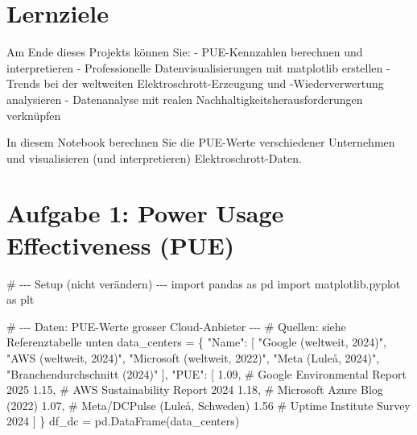 \documentclass[
  nswissgerman,
  a4paper,
  DIV=11,
  numbers=noendperiod,
  ngerman]{scrreprt}
\newenvironment{Shaded}{\begin{snugshade}}{\end{snugshade}}
\newcommand{\CommentTok}[1]{\textcolor[rgb]{0.37,0.37,0.37}{#1}}
\newcommand{\FloatTok}[1]{\textcolor[rgb]{0.68,0.00,0.00}{#1}}
\newcommand{\ImportTok}[1]{\textcolor[rgb]{0.00,0.46,0.62}{#1}}
\newcommand{\NormalTok}[1]{\textcolor[rgb]{0.00,0.23,0.31}{#1}}
\newcommand{\OperatorTok}[1]{\textcolor[rgb]{0.37,0.37,0.37}{#1}}
\newcommand{\StringTok}[1]{\textcolor[rgb]{0.13,0.47,0.30}{#1}}
\begin{document}
\section{Lernziele}\label{lernziele-1}

Am Ende dieses Projekts können Sie: - PUE-Kennzahlen berechnen und
interpretieren - Professionelle Datenvisualisierungen mit matplotlib
erstellen - Trends bei der weltweiten Elektroschrott-Erzeugung und
-Wiederverwertung analysieren - Datenanalyse mit realen
Nachhaltigkeitsherausforderungen verknüpfen

In diesem Notebook berechnen Sie die PUE-Werte verschiedener Unternehmen
und visualisieren (und interpretieren) Elektroschrott-Daten.

\section{Aufgabe 1: Power Usage Effectiveness
(PUE)}\label{aufgabe-1-power-usage-effectiveness-pue}

\begin{Shaded}
\begin{Highlighting}[numbers=left,,]
\CommentTok{\# {-}{-}{-} Setup (nicht verändern) {-}{-}{-}}
\ImportTok{import}\NormalTok{ pandas }\ImportTok{as}\NormalTok{ pd}
\ImportTok{import}\NormalTok{ matplotlib.pyplot }\ImportTok{as}\NormalTok{ plt}

\CommentTok{\# {-}{-}{-} Daten: PUE{-}Werte grosser Cloud{-}Anbieter {-}{-}{-}}
\CommentTok{\# Quellen: siehe Referenztabelle unten}
\NormalTok{data\_centers }\OperatorTok{=}\NormalTok{ \{}
    \StringTok{"Name"}\NormalTok{: [}
        \StringTok{"Google (weltweit, 2024)"}\NormalTok{,}
        \StringTok{"AWS (weltweit, 2024)"}\NormalTok{,}
        \StringTok{"Microsoft (weltweit, 2022)"}\NormalTok{,}
        \StringTok{"Meta (Luleå, 2024)"}\NormalTok{,}
        \StringTok{"Branchendurchschnitt (2024)"}
\NormalTok{    ],}
    \StringTok{"PUE"}\NormalTok{: [}
        \FloatTok{1.09}\NormalTok{,   }\CommentTok{\# Google Environmental Report 2025}
        \FloatTok{1.15}\NormalTok{,   }\CommentTok{\# AWS Sustainability Report 2024}
        \FloatTok{1.18}\NormalTok{,   }\CommentTok{\# Microsoft Azure Blog (2022)}
        \FloatTok{1.07}\NormalTok{,   }\CommentTok{\# Meta/DCPulse (Luleå, Schweden)}
        \FloatTok{1.56}    \CommentTok{\# Uptime Institute Survey 2024}
\NormalTok{    ]}
\NormalTok{\}}
\NormalTok{df\_dc }\OperatorTok{=}\NormalTok{ pd.DataFrame(data\_centers)}
\end{Highlighting}
\end{Shaded}
\end{document}
